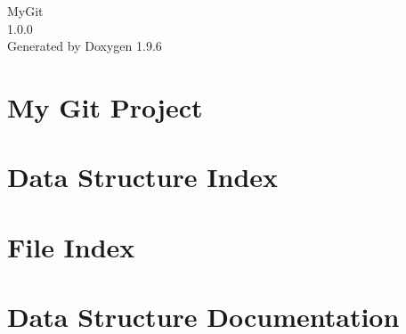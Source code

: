 \documentclass[twoside]{book}
\newcommand{\+}{\discretionary{\mbox{\scriptsize$\hookleftarrow$}}{}{}}
\newcommand{\clearemptydoublepage}{%
    \newpage{\pagestyle{empty}\cleardoublepage}%
  }
\begin{document}
  \raggedbottom
  \begin{titlepage}
  \vspace*{7cm}
  \begin{center}%
  {\Large My\+Git}\\
  [1ex]\large 1.\+0.\+0 \\
  \vspace*{1cm}
  {\large Generated by Doxygen 1.9.6}\\
  \end{center}
  \end{titlepage}
  \clearemptydoublepage
  \tableofcontents
  \clearemptydoublepage
\chapter{My Git Project}
\label{md__r_e_a_d_m_e}

\chapter{Data Structure Index}

\chapter{File Index}

\chapter{Data Structure Documentation}





\end{document}
